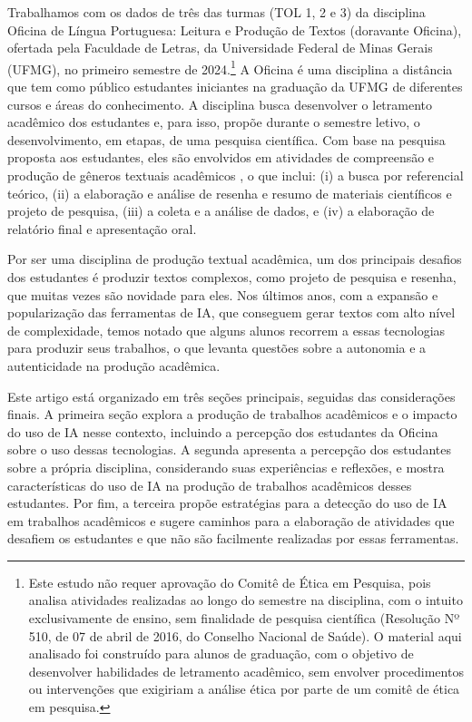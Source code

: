 \documentclass[portuguese]{textolivre}
\begin{document}
Trabalhamos com os dados de três das turmas (TOL 1, 2 e 3) da disciplina Oficina de Língua Portuguesa: Leitura e Produção de Textos (doravante Oficina), ofertada pela Faculdade de Letras, da Universidade Federal de Minas Gerais (UFMG), no primeiro semestre de 2024.\footnote{Este estudo não requer aprovação do Comitê de Ética em Pesquisa, pois analisa atividades realizadas ao longo do semestre na disciplina, com o intuito exclusivamente de ensino, sem finalidade de pesquisa científica (Resolução Nº 510, de 07 de abril de 2016, do Conselho Nacional de Saúde). O material aqui analisado foi construído para alunos de graduação, com o objetivo de desenvolver habilidades de letramento acadêmico, sem envolver procedimentos ou intervenções que exigiriam a análise ética por parte de um comitê de ética em pesquisa.} A Oficina é uma disciplina a distância que tem como público estudantes iniciantes na graduação da UFMG de diferentes cursos e áreas do conhecimento. A disciplina busca desenvolver o letramento acadêmico dos estudantes e, para isso, propõe durante o semestre letivo, o desenvolvimento, em etapas, de uma pesquisa científica. Com base na pesquisa proposta aos estudantes, eles são envolvidos em atividades de compreensão e produção de gêneros textuais acadêmicos \cite{coscarelli2017}, o que inclui: (i) a busca por referencial teórico, (ii) a elaboração e análise de resenha e resumo de materiais científicos e projeto de pesquisa, (iii) a coleta e a análise de dados, e (iv) a elaboração de relatório final e apresentação oral.

Por ser uma disciplina de produção textual acadêmica, um dos principais desafios dos estudantes é produzir textos complexos, como projeto de pesquisa e resenha, que muitas vezes são novidade para eles. Nos últimos anos, com a expansão e popularização das ferramentas de IA, que conseguem gerar textos com alto nível de complexidade, temos notado que alguns alunos recorrem a essas tecnologias para produzir seus trabalhos, o que levanta questões sobre a autonomia e a autenticidade na produção acadêmica.

Este artigo está organizado em três seções principais, seguidas das considerações finais. A primeira seção explora a produção de trabalhos acadêmicos e o impacto do uso de IA nesse contexto, incluindo a percepção dos estudantes da Oficina sobre o uso dessas tecnologias. A segunda apresenta a percepção dos estudantes sobre a própria disciplina, considerando suas experiências e reflexões, e mostra características do uso de IA na produção de trabalhos acadêmicos desses estudantes. Por fim, a terceira propõe estratégias para a detecção do uso de IA em trabalhos acadêmicos e sugere caminhos para a elaboração de atividades que desafiem os estudantes e que não são facilmente realizadas por essas ferramentas.
\end{document}
